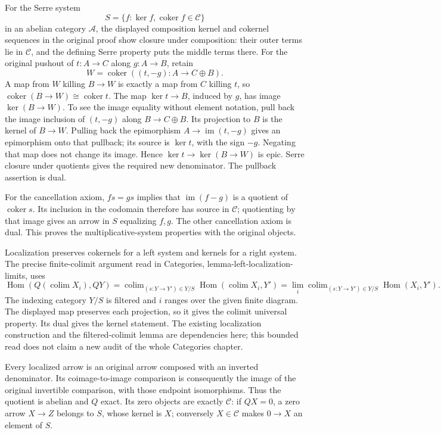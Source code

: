 \documentclass[11pt]{article}
\begin{document}
For the Serre system \[
S=\{f:\ker f,\operatorname{coker}f\in\mathcal C\}
\] in an abelian category \(\mathcal A\), the displayed composition kernel and cokernel sequences in the original proof show closure under composition: their outer terms lie in \(\mathcal C\), and the defining Serre property puts the middle terms there. For the original pushout of \(t:A\to C\) along \(g:A\to B\), retain \[
W=\operatorname{coker}((t,-g):A\to C\oplus B).
\] A map from \(W\) killing \(B\to W\) is exactly a map from \(C\) killing \(t\), so \(\operatorname{coker}(B\to W)\cong\operatorname{coker}t\). The map \(\ker t\to B\), induced by \(g\), has image \(\ker(B\to W)\). To see the image equality without element notation, pull back the image inclusion of \((t,-g)\) along \(B\to C\oplus B\). Its projection to \(B\) is the kernel of \(B\to W\). Pulling back the epimorphism \(A\to\operatorname{im}(t,-g)\) gives an epimorphism onto that pullback; its source is \(\ker t\), with the sign \(-g\). Negating that map does not change its image. Hence \(\ker t\to\ker(B\to W)\) is epic. Serre closure under quotients gives the required new denominator. The pullback assertion is dual.

For the cancellation axiom, \(fs=gs\) implies that \(\operatorname{im}(f-g)\) is a quotient of \(\operatorname{coker}s\). Its inclusion in the codomain therefore has source in \(\mathcal C\); quotienting by that image gives an arrow in \(S\) equalizing \(f,g\). The other cancellation axiom is dual. This proves the multiplicative-system properties with the original objects.

Localization preserves cokernels for a left system and kernels for a right system. The precise finite-colimit argument read in Categories, lemma-left-localization-limits, uses \[
\operatorname{Hom}(Q(\operatorname{colim}X_i),QY)
 =
\operatorname{colim}_{(s:Y\to Y')\in Y/S}
\operatorname{Hom}(\operatorname{colim}X_i,Y')
 =
\lim_i\operatorname{colim}_{(s:Y\to Y')\in Y/S}
\operatorname{Hom}(X_i,Y').
\] The indexing category \(Y/S\) is filtered and \(i\) ranges over the given finite diagram. The displayed map preserves each projection, so it gives the colimit universal property. Its dual gives the kernel statement. The existing localization construction and the filtered-colimit lemma are dependencies here; this bounded read does not claim a new audit of the whole Categories chapter.

Every localized arrow is an original arrow composed with an inverted denominator. Its coimage-to-image comparison is consequently the image of the original invertible comparison, with those endpoint isomorphisms. Thus the quotient is abelian and \(Q\) exact. Its zero objects are exactly \(\mathcal C\): if \(QX=0\), a zero arrow \(X\to Z\) belongs to \(S\), whose kernel is \(X\); conversely \(X\in\mathcal C\) makes \(0\to X\) an element of \(S\).
\end{document}
